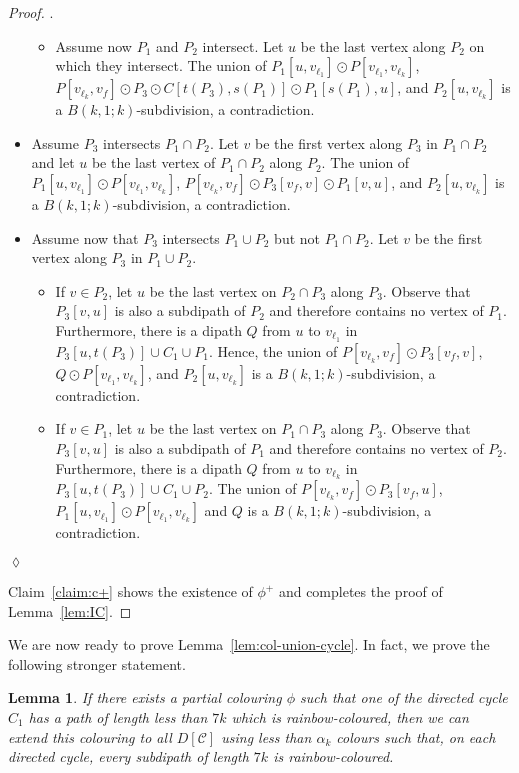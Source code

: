 \documentclass[utf8,10pt]{article}
\theoremstyle{plain}
\newtheorem{lemma}[theorem]{Lemma}
\theoremstyle{definition}
\theoremstyle{remark}
\newenvironment{subproof}{\par\noindent {\it Subproof}.\ }{\hfill$\lozenge$\par\vspace{11pt}}
\begin{document}
\begin{proof}
\begin{subproof}
\begin{itemize}
\begin{itemize}
		\item Assume now $P_1$ and $P_2$ intersect. Let $u$ be the last vertex along $P_2$ on which they intersect. The union of $P_1[u,v_{\ell_1}]\odot P[v_{\ell_1}, v_{\ell_k}]$, $P[v_{\ell_k}, v_f]\odot P_3\odot C[t(P_3), s(P_1)]\odot P_1[s(P_1), u]$, and $P_2[u, v_{\ell_k}]$ is a $B(k,1;k)$-subdivision, a contradiction.
	\end{itemize}

	\item Assume $P_3$ intersects $P_1\cap P_2$. Let $v$ be the first vertex along $P_3$ in $P_1\cap P_2$ and let $u$ be the last vertex of $P_1\cap P_2$ along $P_2$. The union of $P_1[u,v_{\ell_1}]\odot P[v_{\ell_1}, v_{\ell_k}]$, $P[v_{\ell_k}, v_f]\odot P_3[v_f,v]\odot P_1[v, u]$, and $P_2[u, v_{\ell_k}]$ is a $B(k,1;k)$-subdivision, a contradiction.

	\item Assume now that $P_3$ intersects $P_1\cup P_2$ but not $P_1\cap P_2$. Let $v$ be the first vertex along $P_3$ in $P_1\cup P_2$.
	\begin{itemize}
	\item If $v \in P_2$, let $u$ be the last vertex on $P_2\cap P_3$ along $P_3$. Observe that $P_3[v,u]$ is also a subdipath of $P_2$ and therefore contains no vertex of $P_1$. Furthermore, there is a dipath $Q$ from $u$ to $v_{\ell_1}$ in $P_3[u, t(P_3)]\cup C_1\cup  P_1$. Hence, the union of $P[v_{\ell_k}, v_f] \odot P_3[v_f,v]$, $Q\odot P[v_{\ell_1},v_{\ell_k}]$, and $P_2[u,v_{\ell_k}]$ is a $B(k,1;k)$-subdivision, a contradiction.
	
	\item If $v\in P_1$, let $u$ be the last vertex on $P_1\cap P_3$ along $P_3$.  Observe that $P_3[v,u]$ is also a subdipath of $P_1$ and therefore contains no vertex of $P_2$. Furthermore, there is a dipath $Q$ from $u$ to $v_{\ell_k}$ in $P_3[u, t(P_3)]\cup C_1\cup  P_2$.
	The union of $P[v_{\ell_k}, v_f] \odot P_3[v_f,u]$, $P_1[u, v_{\ell_1}]\odot P[v_{\ell_1}, v_{\ell_k}]$ and $Q$ is a $B(k,1;k)$-subdivision, a contradiction.

	\end{itemize}
\end{itemize}
\end{subproof}

Claim~\ref{claim:c+} shows the existence of $\phi^+$ and completes the proof of Lemma~\ref{lem:IC}.
\end{proof}


We are now ready to prove Lemma~\ref{lem:col-union-cycle}. In fact, we prove the following stronger statement.
\begin{lemma}
If there exists
a partial colouring $\phi$ such that one of the directed cycle $C_1$ has a path of length less than $7k$
which is rainbow-coloured, then we can extend this colouring to all $D[\mathcal{C}]$ using less
than $\alpha_k$ colours such that, on each directed cycle, every subdipath of length
$7k$ is rainbow-coloured.
\end{lemma}
\end{document}
